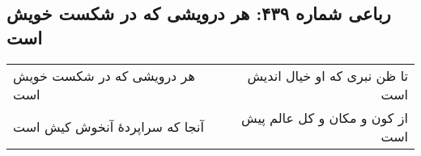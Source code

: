 \begin{center}
\section*{رباعی شماره ۴۳۹: هر درویشی که در شکست خویش است}
\label{sec:0439}
\begin{longtable}{l p{0.5cm} r}
هر درویشی که در شکست خویش است
&&
تا ظن نبری که او خیال اندیش است
\\
آنجا که سراپردهٔ آنخوش کیش است
&&
از کون و مکان و کل عالم پیش است
\\
\end{longtable}
\end{center}
